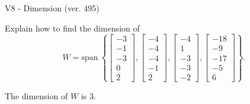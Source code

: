 \begin{exercise}
  \begin{exerciseTitle}V8 - Dimension (ver. 495)\end{exerciseTitle}
  \begin{exerciseStatement}
    Explain how to find the dimension of 
\[W=\mathrm{span}\ \left\{\left[\begin{array}{r}
-3 \\
-1 \\
-3 \\
0 \\
2
\end{array}\right] , \left[\begin{array}{r}
-4 \\
-4 \\
-4 \\
-1 \\
2
\end{array}\right] , \left[\begin{array}{r}
-4 \\
1 \\
-3 \\
-3 \\
-2
\end{array}\right] , \left[\begin{array}{r}
-18 \\
-9 \\
-17 \\
-5 \\
6
\end{array}\right]\right\}.\]



  \end{exerciseStatement}
  \begin{exerciseAnswer}
   The dimension of \(W\) is  \(3\).
  


  \end{exerciseAnswer}
\end{exercise}